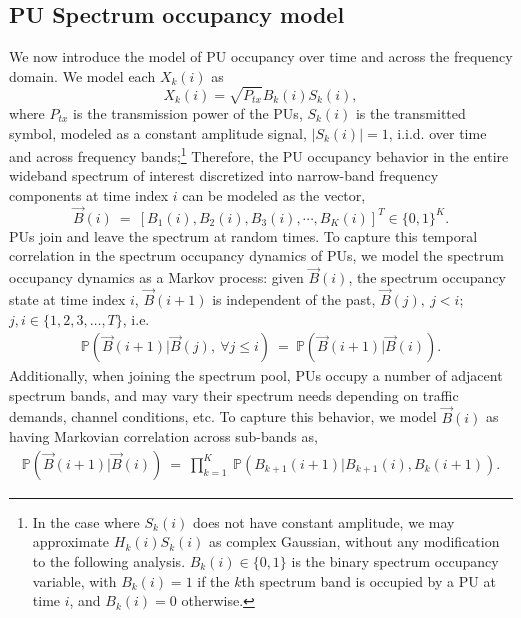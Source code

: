 \documentclass[10pt,twocolumn]{IEEEtran}
\begin{document}
\subsection{PU Spectrum occupancy model}
We now introduce the model of PU occupancy over time and across the frequency domain. We model each $X_k(i)$ as
\begin{equation}\label{4}
    X_k(i)=\sqrt{P_{tx}}B_k(i)S_k(i),
\end{equation}
where $P_{tx}$ is the transmission power of the PUs, $S_k(i)$ is the transmitted symbol, modeled as a 
constant amplitude signal, $|S_k(i)|=1$, i.i.d. over time and across frequency bands;\footnote{In the case where
$S_k(i)$ does not have constant amplitude, we may approximate $H_{k}(i)S_{k}(i)$ as complex Gaussian, without any modification to the following analysis. $B_k(i)\in\{0,1\}$ is the binary spectrum occupancy variable, with $B_k(i)=1$ if the $k$th spectrum band is occupied by a PU at time $i$, and $B_k(i)=0$ otherwise.} Therefore, the PU occupancy behavior in the entire wideband spectrum of interest discretized into narrow-band frequency components at time index $i$ can be modeled as the vector,
\begin{equation}\label{5}
    \vec{B}(i)\ =\ [B_1(i),B_2(i),B_3(i),\cdots,B_K(i)]^T \in \{0,1\}^K.
\end{equation}
PUs join and leave the spectrum at random times. To capture this temporal correlation in the spectrum occupancy dynamics of PUs,
we model the spectrum occupancy dynamics as a Markov process: given $\vec{B}(i)$, the spectrum occupancy state at time index $i$, $\vec{B}(i+1)$ is independent of the past, $\vec{B}(j),\ j < i$; $j, i \in \{1,2,3,\dots,T\}$, i.e.
\begin{equation}\label{6}
    \begin{aligned}
        \mathbb{P}(\vec{B}(i+1)|\vec{B}(j),\ \forall j \leq i)\ =\ \mathbb{P}(\vec{B}(i+1)|\vec{B}(i)).
    \end{aligned}
\end{equation}
Additionally, when joining the spectrum pool, PUs occupy a number of adjacent spectrum bands, and may vary their spectrum needs depending on traffic demands, channel conditions, etc. To capture this behavior, we model $\vec{B}(i)$ as having Markovian correlation across sub-bands as,
\begin{equation}\label{7}
    \begin{aligned}
         \mathbb{P}(\vec{B}(i+1)|\vec{B}(i))\ =\ 
         \prod_{k=1}^K\ \mathbb{P}(B_{k+1}(i+1)|B_{k+1}(i),B_{k}(i+1)).
    \end{aligned}
\end{equation}
\end{document}
